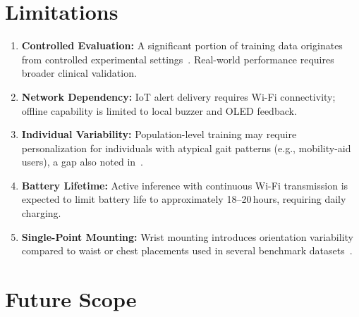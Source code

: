 \documentclass[conference]{IEEEtran}
\begin{document}
\section{Limitations}
\label{sec:limits}

\begin{enumerate}
  \item \textbf{Controlled Evaluation:} A significant portion of training
        data originates from controlled experimental
        settings~\cite{sisfall2017,mobiact2020}. Real-world performance
        requires broader clinical validation.
  \item \textbf{Network Dependency:} IoT alert delivery requires Wi-Fi
        connectivity; offline capability is limited to local buzzer and
        OLED feedback.
  \item \textbf{Individual Variability:} Population-level training may
        require personalization for individuals with atypical gait patterns
        (e.g., mobility-aid users), a gap also noted in~\cite{khalil2026}.
  \item \textbf{Battery Lifetime:} Active inference with continuous Wi-Fi
        transmission is expected to limit battery life to approximately
        18--20\,hours, requiring daily charging.
  \item \textbf{Single-Point Mounting:} Wrist mounting introduces
        orientation variability compared to waist or chest placements used
        in several benchmark datasets~\cite{sisfall2017}.
\end{enumerate}

\section{Future Scope}
\label{sec:future}
\end{document}
